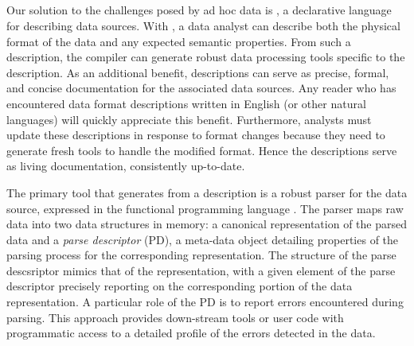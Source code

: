 
\subsection{\padsmlbig{}}

Our solution to the challenges posed by ad hoc data is \padsml{},
a declarative language for describing data sources. With \padsml{}, a
data analyst can describe both the physical format of the data and any
expected semantic properties. From such a description, the
\padsml{} compiler can generate robust data
processing tools specific to the description. As an additional benefit, 
\padsml{} descriptions can serve as precise, formal, and concise
documentation for the associated data sources.  Any reader who has encountered
data format descriptions written in English (or other natural
languages) will quickly appreciate this benefit. Furthermore,
analysts must update these descriptions in response to format changes
because they need to generate fresh tools to handle the modified format.
Hence the descriptions serve as living documentation, consistently up-to-date.

The primary tool that \padsml{} generates from a
description is a robust parser for the data source, expressed in the
functional programming language \ocaml{}.  The parser maps raw data
into two data structures in memory: a canonical
representation of the parsed data and a \textit{parse descriptor}
(PD), a meta-data object detailing properties of the parsing process
for the corresponding representation. The structure of the parse
descsriptor mimics that of the representation, with a given element of
the parse descriptor precisely reporting on the corresponding portion
of the data representation. A particular role of the PD is to report
errors encountered during parsing.  This approach provides down-stream
tools or user code with programmatic access to a detailed profile of
the errors detected in the data.



